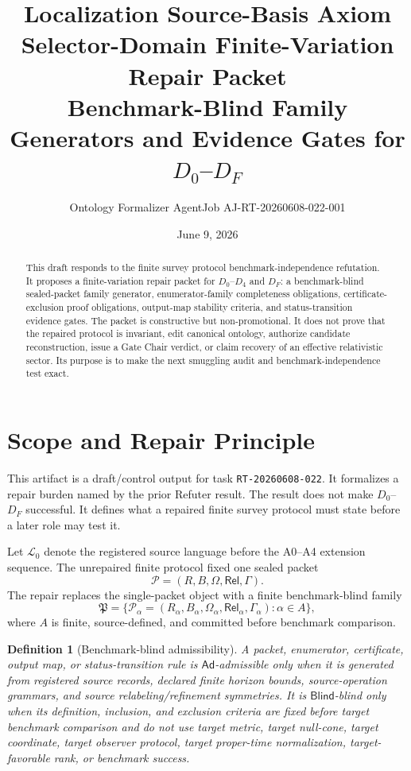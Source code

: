 \documentclass[11pt]{article}
\title{\textbf{Localization Source-Basis Axiom Selector-Domain Finite-Variation Repair Packet}\\[0.35em]
\large Benchmark-Blind Family Generators and Evidence Gates for \(D_0\)--\(D_F\)}
\author{Ontology Formalizer AgentJob AJ-RT-20260608-022-001}
\date{June 9, 2026}
\newcommand{\Lang}{\mathcal{L}_{0}}
\newcommand{\Pack}{\mathcal{P}}
\newcommand{\PackFam}{\mathfrak{P}}
\newcommand{\Rel}{\mathsf{Rel}}
\newcommand{\GammaB}{\Gamma}
\newcommand{\Ad}{\mathsf{Ad}}
\newcommand{\Blind}{\mathsf{Blind}}
\newtheorem{definitionblock}{Definition}
\begin{document}
\maketitle

\begin{abstract}
This draft responds to the finite survey protocol benchmark-independence
refutation. It proposes a finite-variation repair packet for \(D_0\)--\(D_4\)
and \(D_F\): a benchmark-blind sealed-packet family generator,
enumerator-family completeness obligations, certificate-exclusion proof
obligations, output-map stability criteria, and status-transition evidence
gates. The packet is constructive but non-promotional. It does not prove that
the repaired protocol is invariant, edit canonical ontology, authorize
candidate reconstruction, issue a Gate Chair verdict, or claim recovery of an
effective relativistic sector. Its purpose is to make the next smuggling
audit and benchmark-independence test exact.
\end{abstract}

\section{Scope and Repair Principle}

This artifact is a draft/control output for task \texttt{RT-20260608-022}.
It formalizes a repair burden named by the prior Refuter result. The result
does not make \(D_0\)--\(D_F\) successful. It defines what a repaired finite
survey protocol must state before a later role may test it.

Let \(\Lang\) denote the registered source language before the A0--A4
extension sequence. The unrepaired finite protocol fixed one sealed packet
\[
\Pack=(R,B,\Omega,\Rel,\GammaB).
\]
The repair replaces the single-packet object with a finite benchmark-blind
family
\[
\PackFam=\{\Pack_\alpha=(R_\alpha,B_\alpha,\Omega_\alpha,\Rel_\alpha,
\GammaB_\alpha):\alpha\in A\},
\]
where \(A\) is finite, source-defined, and committed before benchmark
comparison.

\begin{definitionblock}[Benchmark-blind admissibility]
A packet, enumerator, certificate, output map, or status-transition rule is
\(\Ad\)-admissible only when it is generated from registered source records,
declared finite horizon bounds, source-operation grammars, and source
relabeling/refinement symmetries. It is \(\Blind\)-blind only when its
definition, inclusion, and exclusion criteria are fixed before target
benchmark comparison and do not use target metric, target null-cone, target
coordinate, target observer protocol, target proper-time normalization,
target-favorable rank, or benchmark success.
\end{definitionblock}
\end{document}

